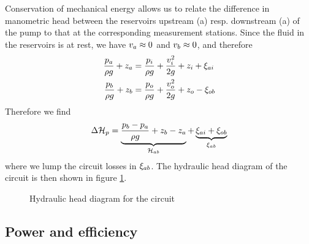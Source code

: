 Conservation of mechanical energy allows us to relate the difference
in manometric head between the reservoirs upstream (a)
resp. downstream (a) of the pump to that at the corresponding
measurement stations. Since the fluid in the reservoirs is at rest, we
have $v_a \approx 0$ and $v_b \approx 0$, and therefore
\begin{align*}
  \frac{p_a}{\rho g} + z_a 
  &= \frac{p_i}{\rho g} + 
  \frac{v_i^2}{2 g} + z_i + \xi_{ai} \\
  \frac{p_b}{\rho g} + z_b 
  &= \frac{p_o}{\rho g} +
  \frac{v_o^2}{2 g} + z_o - \xi_{ob}
\end{align*}
Therefore we find
\begin{align*}
  \Delta \mathcal H_p = 
  \underbrace{\frac{p_b - p_a}{\rho g} + z_b - z_a}_{\mathcal H_{ab}} + 
  \underbrace{\xi_{ai} + \xi_{ob}}_{\xi_{ab}}
\end{align*}
where we lump the circuit losses in $\xi_{ab}$. The hydraulic head
diagram of the circuit is then shown in figure
\ref{fig:headDiagramCircuit}.
\begin{figure}[!h]
  \centering{}
  \caption{Hydraulic head diagram for the circuit}
  \label{fig:headDiagramCircuit}
\end{figure}

\subsection{Power and efficiency}

